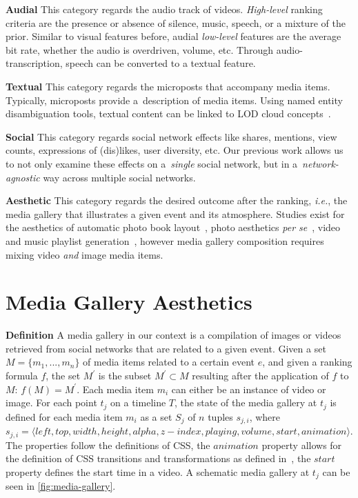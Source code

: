\documentclass{article}
\begin{document}
\noindent \textbf{Audial}
This category regards the audio track of videos.
\emph{High-level} ranking criteria are the presence or absence
of silence, music, speech, or a mixture of the prior.
Similar to visual features before,
audial \emph{low-level}  features are the average bit rate,
whether the audio is overdriven, volume, etc.
Through audio-transcription, speech can be converted to a textual feature.

\noindent \textbf{Textual}
This category regards the microposts that accompany media items.
Typically, microposts provide a~description of media items.
Using named entity disambiguation tools,
textual content can be linked to LOD cloud concepts~\cite{Facebook2011}.

\noindent \textbf{Social}
This category regards social network effects like shares, mentions,
view counts, expressions of (dis)likes, user diversity, etc.
Our previous work allows us to not only examine these effects
on a~\emph{single} social network,
but in a~\emph{network-agnostic} way across multiple social networks.

\noindent \textbf{Aesthetic}
This category regards the desired outcome after the ranking, \emph{i.e.},
the media gallery that illustrates a given event and its atmosphere.
Studies exist for the aesthetics of
automatic photo book layout~\cite{Photo2011},
photo aesthetics \emph{per se}~\cite{Photo2012},
video and music playlist generation~\cite{YouTube2010,Playlist2006},
however media gallery composition requires mixing video
\emph{and} image media items.

\section{Media Gallery Aesthetics}

\noindent \textbf{Definition}
A media gallery in our context is a compilation of images or videos
retrieved from social networks that are related to a given event.
Given a set $M = \{m_1,..., m_n\}$ of media items related to a certain event $e$,
and given a ranking formula $f$,
the set $M^\prime$ is the subset $M^\prime \subset M$
resulting after the application of $f$ to $M$: $f(M)=M^\prime$.
Each media item $m_i$ can either be an instance of video or image.
For each point $t_j$ on a timeline $T$, the state of the media gallery
at $t_j$ is defined for each media item $m_i$
as a set $S_j$ of $n$ tuples $s_{j,i}$, where
$s_{j,i}=\langle left, top, width, height, alpha, z-index, playing,
volume, start, animation \rangle$.
The properties follow the definitions of CSS, the $animation$ property
allows for the definition of CSS transitions
and transformations as defined in~\cite{CSSTransitions2009,CSSTransforms2012},
the $start$ property defines the start time in a video. 
A schematic media gallery at $t_j$ can be seen in \autoref{fig:media-gallery}.
\end{document}
